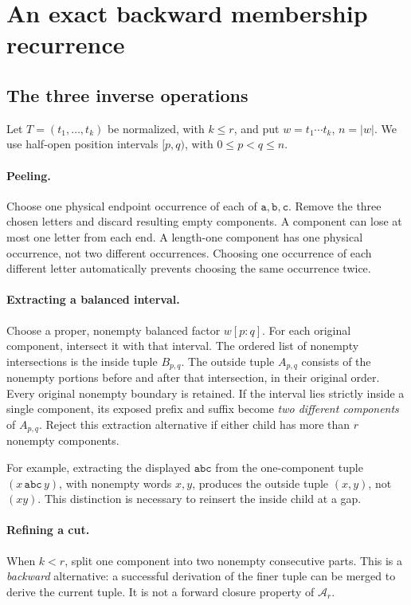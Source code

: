 \documentclass[11pt,letterpaper]{article}
\numberwithin{equation}{section}
\theoremstyle{definition}
\theoremstyle{remark}
\newcommand{\A}{\mathcal A}
\newcommand{\len}[1]{\lvert #1\rvert}
\renewcommand{\aa}{\mathtt a}
\newcommand{\bb}{\mathtt b}
\newcommand{\cc}{\mathtt c}
\newcommand{\word}[1]{\texttt{#1}}
\begin{document}
\section{An exact backward membership recurrence}
\label{sec:parser}

\subsection{The three inverse operations}
Let \(T=(t_1,\ldots,t_k)\) be normalized, with \(k\leq r\), and put
\(w=t_1\cdots t_k\), \(n=\len{w}\). We use half-open position intervals
\([p,q)\), with \(0\leq p<q\leq n\).

\paragraph{Peeling.}
Choose one physical endpoint occurrence of each of \(\aa,\bb,\cc\).
Remove the three chosen letters and discard resulting empty components.
A component can lose at most one letter from each end. A length-one
component has one physical occurrence, not two different occurrences.
Choosing one occurrence of each different letter automatically prevents
choosing the same occurrence twice.

\paragraph{Extracting a balanced interval.}
Choose a proper, nonempty balanced factor \(w[p:q]\). For each original
component, intersect it with that interval. The ordered list of nonempty
intersections is the inside tuple \(B_{p,q}\). The outside tuple
\(A_{p,q}\) consists of the nonempty portions before and after that
intersection, in their original order. Every original nonempty boundary is
retained. If the interval lies strictly inside a single component, its
exposed prefix and suffix become \emph{two different components} of
\(A_{p,q}\). Reject this extraction alternative if either child has more
than \(r\) nonempty components.

For example, extracting the displayed \(\word{abc}\) from the
one-component tuple \((x\,\word{abc}\,y)\), with nonempty words
\(x,y\), produces the outside tuple \((x,y)\), not \((xy)\). This distinction is necessary to reinsert the inside
child at a gap.

\paragraph{Refining a cut.}
When \(k<r\), split one component into two nonempty consecutive parts.
This is a \emph{backward} alternative: a successful derivation of the
finer tuple can be merged to derive the current tuple. It is not a
forward closure property of \(\A_r\).
\end{document}
